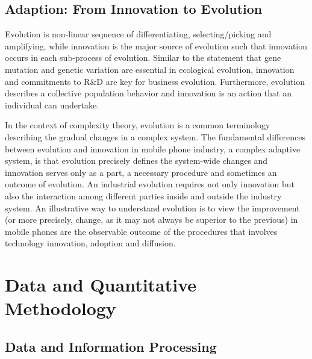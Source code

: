 \documentclass[utf8,english]{gradu3}
\begin{document}
\section{Adaption: From Innovation to Evolution }

Evolution is non-linear sequence of differentiating, selecting/picking and amplifying, while innovation is the major source of evolution such that innovation occurs in each sub-process of evolution. Similar to the statement that gene mutation and genetic variation are essential in ecological evolution, innovation and commitments to R\&D are key for business evolution. Furthermore, evolution describes a collective population behavior and innovation is an action that an individual can undertake.

In the context of complexity theory, evolution is a common terminology describing the gradual changes in a complex system. The fundamental differences between evolution and innovation in mobile phone industry, a complex adaptive system, is that evolution precisely defines the system-wide changes and innovation serves only as a part, a necessary procedure and sometimes an outcome of evolution. An industrial evolution requires not only innovation but also the interaction among different parties inside and outside the industry system. An illustrative way to understand evolution is to view the improvement (or more precisely, change, as it may not always be superior to the previous) in mobile phones are the observable outcome of the procedures that involves technology innovation, adoption and diffusion.

\chapter{Data and Quantitative Methodology}

\section{Data and Information Processing}
\end{document}
